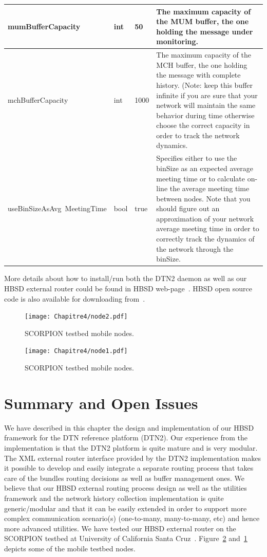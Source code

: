 \begin{longtable}[!h]{|p{4cm}|p{1cm}|p{2.2cm}|p{5cm}|}
\hline
mumBufferCapacity & int & 50& The maximum capacity of the MUM buffer, the one holding the message under monitoring. \\
\hline
mchBufferCapacity & int & 1000 & The maximum capacity of the MCH buffer, the one holding the message with complete history. 
(Note: keep this buffer infinite if you are sure that your network will maintain the same behavior during time otherwise choose the correct capacity in order to track the network dynamics.\\
\hline
useBinSizeAsAvg\ MeetingTime & bool & true& Specifies either to use the binSize as an expected average meeting time or to calculate on-line the average meeting time between nodes. Note that you should figure out an approximation of your network average meeting time in order to correctly track the dynamics of the network through the binSize.\\
\hline
\end{longtable}

More details about how to install/run both the DTN2 daemon as well as our HBSD external router could be found in HBSD web-page~\cite{HBSDDTN2}. HBSD open source code is also available for downloading from~\cite{HBSDDTN2}. 

\begin{figure}[!h]
  \begin{center}
    \texttt{[image: Chapitre4/node2.pdf]}
  \end{center}
  \caption{SCORPION testbed mobile nodes.}
  \label{SCORPION-nodes-1}
\end{figure}

\begin{figure}[!h]
  \begin{center}
    \texttt{[image: Chapitre4/node1.pdf]}
  \end{center}
  \caption{ SCORPION testbed mobile nodes.}
  \label{SCORPION-nodes-2}
\end{figure}

\section{Summary and Open Issues}

We have described in this chapter the design and implementation of our HBSD framework for the DTN reference platform (DTN2). Our experience from the implementation is that the DTN2 platform is quite mature and is very modular. The XML external router interface provided by the DTN2 implementation makes it possible to develop and easily integrate a separate routing process that takes care of the bundles routing decisions as well as buffer management ones. We believe that our HBSD external routing process design as well as the utilities framework and the network history collection implementation is quite generic/modular and that it can be easily extended in order to support more complex communication scenario(s) (one-to-many, many-to-many, etc) and hence more advanced utilities. We have tested our HBSD external router on the SCORPION testbed at University of California Santa Cruz~\cite{HBSDDTN2}. Figure~\ref{SCORPION-nodes-2} and~\ref{SCORPION-nodes-1} depicts some of the mobile testbed nodes.


